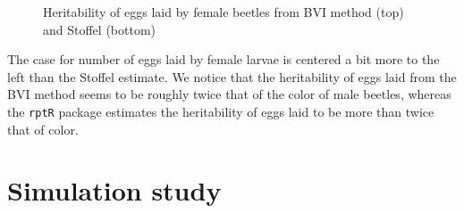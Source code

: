 \begin{figure}[!ht]
  \centering
  \caption{Heritability of eggs laid by female beetles from BVI method (top) and Stoffel (bottom)}
\end{figure}

The case for number of eggs laid by female larvae is centered a bit more to the left than the Stoffel estimate. We notice that the heritability of eggs laid from the BVI method seems to be roughly twice that of the color of male beetles, whereas the \texttt{rptR} package estimates the heritability of eggs laid to be more than twice that of color.





\section{Simulation study}

